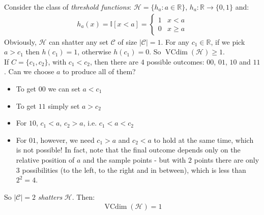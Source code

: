 \documentclass[../template.tex]{subfiles}
\begin{document}
\begin{example}
Consider the class of \textit{threshold functions}: $\mathcal{H} = \{h_a\colon a \in \mathbb{R}\}$, $h_a \colon \mathbb{R} \to \{0,1\}$ and:
\begin{align*}
    h_a(x) = \mathbb{I}[x < a] = \begin{cases}
        1 & x < a\\
        0 & x \geq a
    \end{cases}
\end{align*}  
Obviously, $\mathcal{H}$ can shatter any set $\mathcal{C}$ of size $|\mathcal{C}| = 1$. For any $c_1 \in \mathbb{R}$, if we pick $a > c_1$ then $h(c_1) = 1$, otherwise $h(c_1) = 0$. So $\operatorname{VCdim}(\mathcal{H}) \geq 1$.\\
If $C=\{c_1, c_2\}$, with $c_1 < c_2$, then there are $4$ possible outcomes: $00$, $01$, $10$ and $11$. Can we choose $a$ to produce all of them?
\begin{itemize}
    \item To get $00$ we can set $a < c_1$
    \item To get $11$ simply set $a > c_2$
    \item For $10$, $c_1 < a$, $c_2 > a$, i.e. $c_1 < a < c_2$
    \item For $01$, however, we need $c_1 > a$ and $c_2 < a$ to hold at the same time, which is not possible! In fact, note that the final outcome depends only on the relative position of $a$ and the sample points - but with $2$ points there are only $3$ possibilities (to the left, to the right and in between), which is less than $2^2 = 4$.        
\end{itemize}
So $|\mathcal{C}| = 2$ \textit{shatters} $\mathcal{H}$. Then:
\begin{align*}
    \operatorname{VCdim}(\mathcal{H}) = 1 
\end{align*}   
\end{example}
\end{document}
